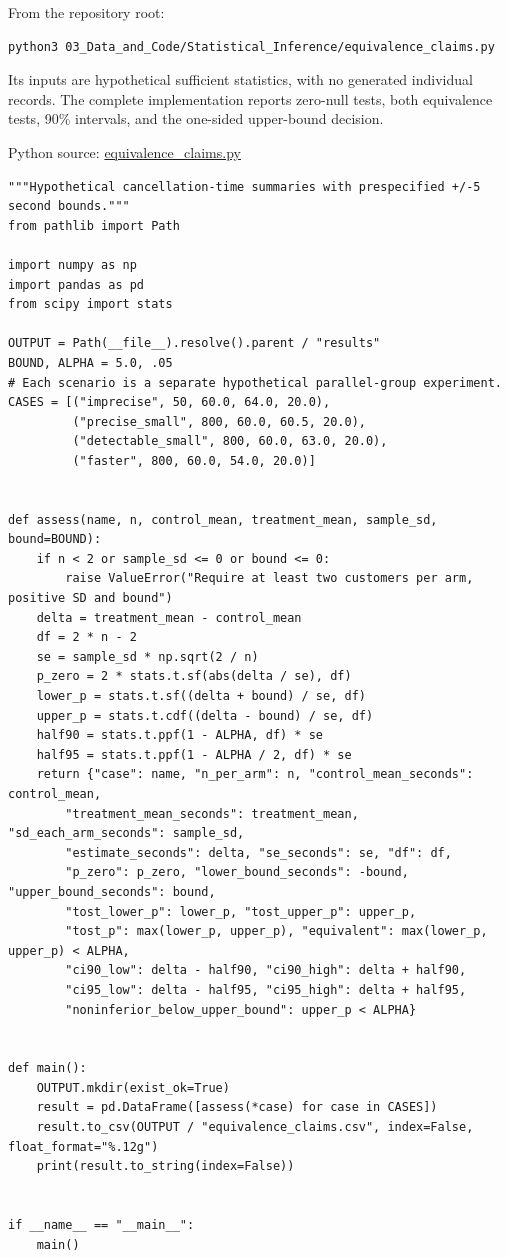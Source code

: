 From the repository root:

\begin{Verbatim}[breaklines,breakanywhere,fontsize=\small]
python3 03_Data_and_Code/Statistical_Inference/equivalence_claims.py
\end{Verbatim}

Its inputs are hypothetical sufficient statistics, with no generated
individual records. The complete implementation reports zero-null tests,
both equivalence tests, 90\% intervals, and the one-sided upper-bound
decision.

\FloatBarrier
{}
Python source:
\href{../03_Data_and_Code/Statistical_Inference/equivalence_claims.py}{equivalence\_claims.py}

\begin{Verbatim}[breaklines,breakanywhere,fontsize=\small]
"""Hypothetical cancellation-time summaries with prespecified +/-5 second bounds."""
from pathlib import Path

import numpy as np
import pandas as pd
from scipy import stats

OUTPUT = Path(__file__).resolve().parent / "results"
BOUND, ALPHA = 5.0, .05
# Each scenario is a separate hypothetical parallel-group experiment.
CASES = [("imprecise", 50, 60.0, 64.0, 20.0),
         ("precise_small", 800, 60.0, 60.5, 20.0),
         ("detectable_small", 800, 60.0, 63.0, 20.0),
         ("faster", 800, 60.0, 54.0, 20.0)]


def assess(name, n, control_mean, treatment_mean, sample_sd, bound=BOUND):
    if n < 2 or sample_sd <= 0 or bound <= 0:
        raise ValueError("Require at least two customers per arm, positive SD and bound")
    delta = treatment_mean - control_mean
    df = 2 * n - 2
    se = sample_sd * np.sqrt(2 / n)
    p_zero = 2 * stats.t.sf(abs(delta / se), df)
    lower_p = stats.t.sf((delta + bound) / se, df)
    upper_p = stats.t.cdf((delta - bound) / se, df)
    half90 = stats.t.ppf(1 - ALPHA, df) * se
    half95 = stats.t.ppf(1 - ALPHA / 2, df) * se
    return {"case": name, "n_per_arm": n, "control_mean_seconds": control_mean,
        "treatment_mean_seconds": treatment_mean, "sd_each_arm_seconds": sample_sd,
        "estimate_seconds": delta, "se_seconds": se, "df": df,
        "p_zero": p_zero, "lower_bound_seconds": -bound, "upper_bound_seconds": bound,
        "tost_lower_p": lower_p, "tost_upper_p": upper_p,
        "tost_p": max(lower_p, upper_p), "equivalent": max(lower_p, upper_p) < ALPHA,
        "ci90_low": delta - half90, "ci90_high": delta + half90,
        "ci95_low": delta - half95, "ci95_high": delta + half95,
        "noninferior_below_upper_bound": upper_p < ALPHA}


def main():
    OUTPUT.mkdir(exist_ok=True)
    result = pd.DataFrame([assess(*case) for case in CASES])
    result.to_csv(OUTPUT / "equivalence_claims.csv", index=False, float_format="%.12g")
    print(result.to_string(index=False))


if __name__ == "__main__":
    main()
\end{Verbatim}

